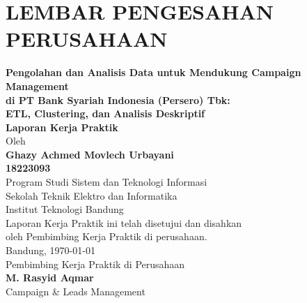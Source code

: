 \chapter*{LEMBAR PENGESAHAN PERUSAHAAN}
\begin{center}
\vspace{0.8cm}
{\large\bfseries Pengolahan dan Analisis Data untuk Mendukung Campaign Management\\
di PT Bank Syariah Indonesia (Persero) Tbk:\\
ETL, Clustering, dan Analisis Deskriptif}\\
\vspace{1.0cm}
{\Large \textbf{Laporan Kerja Praktik}}\\
\vspace{0.8cm}
{\large Oleh}\\[0.3cm]
\textbf{{\large Ghazy Achmed Movlech Urbayani}\\{\large 18223093}}\\
\vspace{0.35cm}
{\large Program Studi Sistem dan Teknologi Informasi}\\
{\large Sekolah Teknik Elektro dan Informatika}\\
{\large Institut Teknologi Bandung}\\
\vspace{1.0cm}
Laporan Kerja Praktik ini telah disetujui dan disahkan\\
oleh Pembimbing Kerja Praktik di perusahaan.\\[0.6cm]
Bandung, \today\\[0.7cm]
Pembimbing Kerja Praktik di Perusahaan\\[2.0cm]
\textbf{M. Rasyid Aqmar}\\[0.15cm]
{\small Campaign \& Leads Management}
\end{center}

\cleardoublepage
